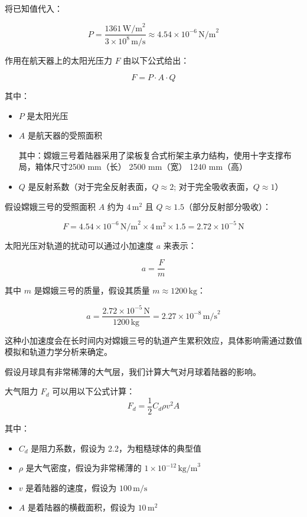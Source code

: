 \documentclass{ctexart}
\begin{document}
将已知值代入：

\[
P = \frac{1361 \, \text{W/m}^2}{3 \times 10^8 \, \text{m/s}} \approx 4.54 \times 10^{-6} \, \text{N/m}^2
\]

作用在航天器上的太阳光压力 \( F \) 由以下公式给出：

\[
F = P \cdot A \cdot Q
\]

其中：
\begin{itemize}
    \item \( P \) 是太阳光压
    \item \( A \) 是航天器的受照面积

其中：嫦娥三号着陆器采用了梁板复合式桁架主承力结构，使用十字支撑布局，箱体尺寸2500 mm（长） 2500 mm（宽） 1240 mm（高）

    \item \( Q \) 是反射系数（对于完全反射表面，\( Q \approx 2 \); 对于完全吸收表面，\( Q \approx 1 \)）
\end{itemize}

假设嫦娥三号的受照面积 \( A \) 约为 \( 4 \, \text{m}^2 \) 且 \( Q \approx 1.5 \)（部分反射部分吸收）：

\[
F = 4.54 \times 10^{-6} \, \text{N/m}^2 \times 4 \, \text{m}^2 \times 1.5 = 2.72 \times 10^{-5} \, \text{N}
\]


太阳光压对轨道的扰动可以通过小加速度 \( a \) 来表示：

\[
a = \frac{F}{m}
\]

其中 \( m \) 是嫦娥三号的质量，假设其质量 \( m \approx 1200 \, \text{kg} \)：

\[
a = \frac{2.72 \times 10^{-5} \, \text{N}}{1200 \, \text{kg}} = 2.27 \times 10^{-8} \, \text{m/s}^2
\]

这种小加速度会在长时间内对嫦娥三号的轨道产生累积效应，具体影响需通过数值模拟和轨道力学分析来确定。

假设月球具有非常稀薄的大气层，我们计算大气对月球着陆器的影响。

大气阻力 \( F_d \) 可以用以下公式计算：
\[
F_d = \frac{1}{2} C_d \rho v^2 A
\]

其中：
\begin{itemize}
    \item \( C_d \) 是阻力系数，假设为 2.2，为粗糙球体的典型值
    \item \( \rho \) 是大气密度，假设为非常稀薄的 \( 1 \times 10^{-12} \, \text{kg/m}^3 \)
    \item \( v \) 是着陆器的速度，假设为 \( 100 \, \text{m/s} \)
    \item \( A \) 是着陆器的横截面积，假设为 \( 10 \, \text{m}^2 \)
\end{itemize}
\end{document}
